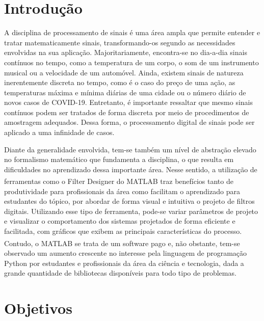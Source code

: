 \documentclass[12pt,a4paper]{report}
\begin{document}
{
  \center
  \listoffigures
  \pagestyle{empty}
  \clearpage
}

{
  \center
  \tableofcontents
  \thispagestyle{empty}
  \clearpage
}

\thispagestyle{empty}
\clearpage
\onehalfspacing

\chapter{Introdução}
  A disciplina de processamento de sinais é uma área ampla que permite entender e tratar matematicamente
  sinais, transformando-os segundo as necessidades envolvidas na sua aplicação. Majoritariamente, encontra-se
  no dia-a-dia sinais contínuos no tempo, como a temperatura de um corpo, o som de um instrumento musical ou a
  velocidade de um automóvel. Ainda, existem sinais de natureza inerentemente discreta no tempo, como é o caso
  do preço de uma ação, as temperaturas máxima e mínima diárias de uma cidade ou o número diário de novos casos
  de COVID-19. Entretanto, é importante ressaltar que mesmo sinais contínuos podem ser tratados de forma discreta
  por meio de procedimentos de amostragem adequados. Dessa forma, o processamento digital de sinais pode ser
  aplicado a uma infinidade de casos.

  Diante da generalidade envolvida, tem-se também um nível de abstração elevado no formalismo matemático que
  fundamenta a disciplina, o que resulta em dificuldades no aprendizado dessa importante área. Nesse sentido,
  a utilização de ferramentas como o Filter Designer do MATLAB\textsuperscript{\textregistered} traz benefícios
  tanto de produtividade para profissionais da área como facilitam o aprendizado para estudantes do tópico, por
  abordar de forma visual e intuitiva o projeto de filtros digitais. Utilizando esse tipo de ferramenta, pode-se
  variar parâmetros de projeto e visualizar o comportamento dos sistemas projetados de forma eficiente e
  facilitada, com gráficos que exibem as principais características do processo. Contudo, o
  MATLAB\textsuperscript{\textregistered} se trata de um software pago e, não obstante, tem-se observado um
  aumento crescente no interesse pela linguagem de programação Python por estudantes e profissionais da área
  da ciência e tecnologia, dada a grande quantidade de bibliotecas disponíveis para todo tipo de problemas.

\chapter{Objetivos}
\end{document}
